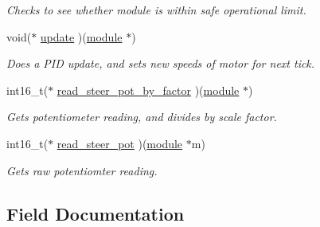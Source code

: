 \begin{DoxyCompactItemize}
\begin{DoxyCompactList}\small\item\em Checks to see whether module is within safe operational limit. \end{DoxyCompactList}\item 
\hypertarget{structmodule__assembly_a5acad1911db4706aa0a24c13f0ef74e6}{}void($\ast$ \hyperlink{structmodule__assembly_a5acad1911db4706aa0a24c13f0ef74e6}{update} )(\hyperlink{structmodule__assembly}{module} $\ast$)\label{structmodule__assembly_a5acad1911db4706aa0a24c13f0ef74e6}

\begin{DoxyCompactList}\small\item\em Does a P\+I\+D update, and sets new speeds of motor for next tick. \end{DoxyCompactList}\item 
\hypertarget{structmodule__assembly_ae927c8ea866d3fe3fd4b13f33c585378}{}int16\+\_\+t($\ast$ \hyperlink{structmodule__assembly_ae927c8ea866d3fe3fd4b13f33c585378}{read\+\_\+steer\+\_\+pot\+\_\+by\+\_\+factor} )(\hyperlink{structmodule__assembly}{module} $\ast$)\label{structmodule__assembly_ae927c8ea866d3fe3fd4b13f33c585378}

\begin{DoxyCompactList}\small\item\em Gets potentiometer reading, and divides by scale factor. \end{DoxyCompactList}\item 
\hypertarget{structmodule__assembly_a8ca2a2c29b9fabeadc95b352bbf18817}{}int16\+\_\+t($\ast$ \hyperlink{structmodule__assembly_a8ca2a2c29b9fabeadc95b352bbf18817}{read\+\_\+steer\+\_\+pot} )(\hyperlink{structmodule__assembly}{module} $\ast$m)\label{structmodule__assembly_a8ca2a2c29b9fabeadc95b352bbf18817}

\begin{DoxyCompactList}\small\item\em Gets raw potentiomter reading. \end{DoxyCompactList}\end{DoxyCompactItemize}


\subsection{Field Documentation}
\hypertarget{structmodule__assembly_a4eaba2980fc35d71f1cc2ec15251cf15}{}
